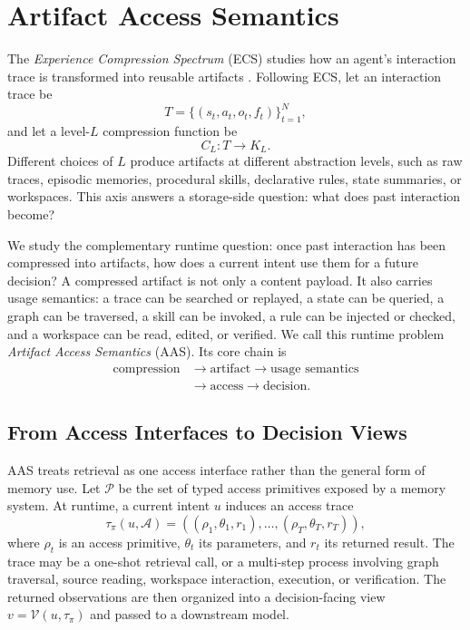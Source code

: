 \section{Artifact Access Semantics}
\label{sec:aas}

The \emph{Experience Compression Spectrum} (ECS) studies how an agent's interaction trace is transformed into reusable artifacts \cite{zhang2026experiencecompressionspectrumunifying}.
Following ECS, let an interaction trace be
\begin{equation}
T=\{(s_t,a_t,o_t,f_t)\}_{t=1}^{N},
\end{equation}
and let a level-$L$ compression function be
\begin{equation}
C_L:T\rightarrow K_L .
\end{equation}
Different choices of $L$ produce artifacts at different abstraction levels, such as raw traces, episodic memories, procedural skills, declarative rules, state summaries, or workspaces.
This axis answers a storage-side question: what does past interaction become?

We study the complementary runtime question: once past interaction has been compressed into artifacts, how does a current intent use them for a future decision?
A compressed artifact is not only a content payload.
It also carries usage semantics: a trace can be searched or replayed, a state can be queried, a graph can be traversed, a skill can be invoked, a rule can be injected or checked, and a workspace can be read, edited, or verified.
We call this runtime problem \emph{Artifact Access Semantics} (AAS).
Its core chain is
\begin{equation}
\begin{aligned}
\text{compression}&\rightarrow\text{artifact}
\rightarrow\text{usage semantics}\\
&\rightarrow\text{access}\rightarrow\text{decision}.
\end{aligned}
\end{equation}

\subsection{From Access Interfaces to Decision Views}
\label{subsec:aas-map}

AAS treats retrieval as one access interface rather than the general form of memory use.
Let $\mathcal{P}$ be the set of typed access primitives exposed by a memory system.
At runtime, a current intent $u$ induces an access trace
\begin{equation}
\tau_\pi(u,\mathcal{A})
=((\rho_1,\theta_1,r_1),\ldots,(\rho_T,\theta_T,r_T)),
\end{equation}
where $\rho_t$ is an access primitive, $\theta_t$ its parameters, and $r_t$ its returned result.
The trace may be a one-shot retrieval call, or a multi-step process involving graph traversal, source reading, workspace interaction, execution, or verification.
The returned observations are then organized into a decision-facing view $v=\mathcal{V}(u,\tau_\pi)$ and passed to a downstream model.

